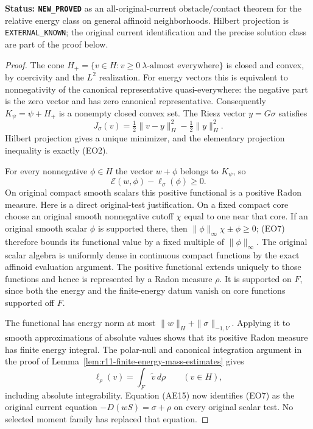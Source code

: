 \documentclass[11pt,a4paper]{article}
\numberwithin{equation}{section}
\theoremstyle{definition}
\theoremstyle{remark}
\begin{document}
\noindent\textbf{Status: \texttt{NEW\_PROVED}} as an
all-original-current obstacle/contact theorem for the relative
energy class on general affinoid neighborhoods.
Hilbert projection is \texttt{EXTERNAL\_KNOWN};
the original current identification and the precise solution
class are part of the proof below.

\begin{proof}
The cone $H_+=\{v\in H:v\geq0\ \lambda\text{-almost everywhere}\}$
is closed and convex, by coercivity and the $L^2$ realization.
For energy vectors this is equivalent to nonnegativity of the
canonical representative quasi-everywhere: the negative part is
the zero vector and has zero canonical representative.
Consequently $K_\psi=\psi+H_+$ is a nonempty closed convex set.
The Riesz vector $y=G\sigma$ satisfies
\[
          J_\sigma(v)=\tfrac12\|v-y\|_H^2-\tfrac12\|y\|_H^2.
 \tag{EO6}
\]
Hilbert projection gives a unique minimizer, and the elementary
projection inequality is exactly (EO2).

For every nonnegative $\phi\in H$ the vector $w+\phi$ belongs
to $K_\psi$, so
\[
                  \mathcal E(w,\phi)-\ell_\sigma(\phi)\geq0.
 \tag{EO7}
\]
On original compact smooth scalars this positive functional is
a positive Radon measure.  Here is a direct original-test
justification.  On a fixed compact core choose an original
smooth nonnegative cutoff $\chi$ equal to one near that core.
If an original smooth scalar $\phi$ is supported there, then
$\|\phi\|_\infty\chi\pm\phi\geq0$; (EO7) therefore bounds its
functional value by a fixed multiple of $\|\phi\|_\infty$.
The original scalar algebra is uniformly dense in continuous
compact functions by the exact affinoid evaluation argument.
The positive functional extends uniquely to those functions
and hence is represented by a Radon measure $\rho$.
It is supported on $F$, since both the energy and the finite-energy
datum vanish on core functions supported off $F$.

The functional has energy norm at most
$\|w\|_H+\|\sigma\|_{-1,V}$.  Applying it to smooth
approximations of absolute values shows that its positive
Radon measure has finite energy integral.  The polar-null and
canonical integration argument in the proof of
Lemma~\ref{lem:r11-finite-energy-mass-estimates} gives
\[
       \ell_\rho(v)=\int_F\widetilde v\,d\rho
                              \qquad(v\in H),
 \tag{EO8}
\]
including absolute integrability.
Equation (AE15) now identifies (EO7) as the original current
equation $-D(wS)=\sigma+\rho$ on every original scalar test.
No selected moment family has replaced that equation.


\end{proof}
\end{document}
